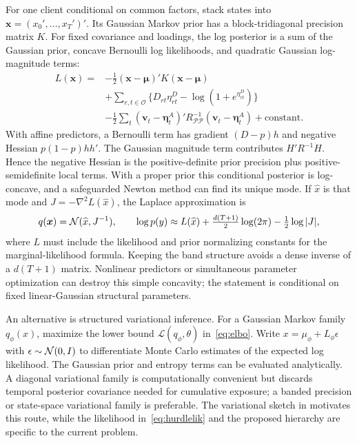 For one client conditional on common factors, stack states into $\bm x=(x_0',\ldots,x_T')'$. Its Gaussian Markov prior has a block-tridiagonal precision matrix $K$. For fixed covariance and loadings, the log posterior is a sum of the Gaussian prior, concave Bernoulli log likelihoods, and quadratic Gaussian log-magnitude terms:
\begin{align}
L(\bm x)={}&-\tfrac12(\bm x-\bm\mu)'K(\bm x-\bm\mu)\nonumber\\
&+\sum_{r,t\in\mathcal O}\{D_{rt}\eta^D_{rt}-\log(1+e^{\eta^D_{rt}})\}\nonumber\\
&-\tfrac12\sum_t(\bm v_t-\bm\eta_t^A)'R_{\mathcal P\mathcal P}^{-1}
                  (\bm v_t-\bm\eta_t^A)+\text{constant}.
\label{eq:laplaceobj}
\end{align}
With affine predictors, a Bernoulli term has gradient $(D-p)h$ and negative Hessian $p(1-p)hh'$. The Gaussian magnitude term contributes $H'R^{-1}H$. Hence the negative Hessian is the positive-definite prior precision plus positive-semidefinite local terms. With a proper prior this conditional posterior is log-concave, and a safeguarded Newton method can find its unique mode. If $\widehat x$ is that mode and $J=-\nabla^2L(\widehat x)$, the Laplace approximation is
\begin{equation}
q(\bm x)=\mathcal N(\widehat x,J^{-1}),\qquad
\log p(y)\approx L(\widehat x)+\tfrac{d(T+1)}2\log(2\pi)-\tfrac12\log|J|,
\end{equation}
where $L$ must include the likelihood and prior normalizing constants for the marginal-likelihood formula. Keeping the band structure avoids a dense inverse of a $d(T+1)$ matrix. Nonlinear predictors or simultaneous parameter optimization can destroy this simple concavity; the statement is conditional on fixed linear-Gaussian structural parameters.

An alternative is structured variational inference. For a Gaussian Markov family $q_\phi(x)$, maximize the lower bound $\mathcal L(q_\phi,\theta)$ in~\eqref{eq:elbo}. Write $x=\mu_\phi+L_\phi\epsilon$ with $\epsilon\sim\mathcal N(0,I)$ to differentiate Monte Carlo estimates of the expected log likelihood. The Gaussian prior and entropy terms can be evaluated analytically. A diagonal variational family is computationally convenient but discards temporal posterior covariance needed for cumulative exposure; a banded precision or state-space variational family is preferable. The variational sketch in \citet[Appendix A.4]{rangapuram2018} motivates this route, while the likelihood in~\eqref{eq:hurdlelik} and the proposed hierarchy are specific to the current problem.

